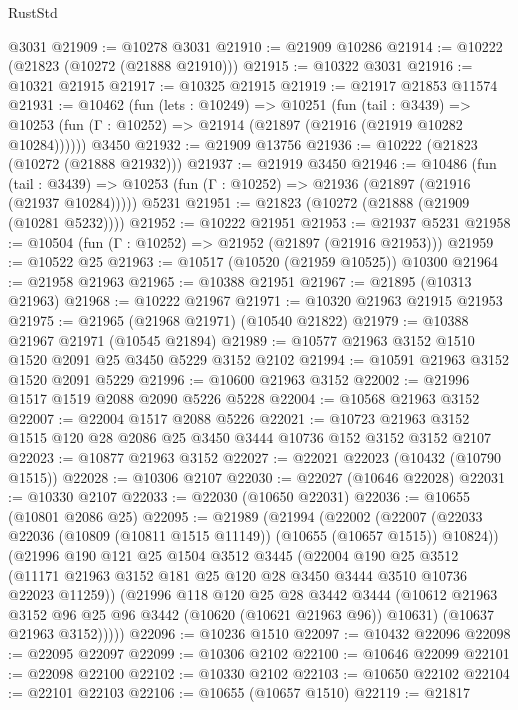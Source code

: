 \begin{lexlean}{RustStd}
\begin{coremodule}
    @3031
@21909 := @10278 @3031
@21910 := @21909 @10286
@21914 := @10222 (@21823 (@10272 (@21888 @21910)))
@21915 := @10322 @3031
@21916 := @10321 @21915
@21917 := @10325 @21915
@21919 := @21917 @21853 @11574
@21931 := @10462
    (fun (lets : @10249) =>
    @10251
      (fun (tail : @3439) =>
      @10253 (fun (Γ : @10252) => @21914 (@21897 (@21916 (@21919 @10282 @10284))))))
    @3450
@21932 := @21909 @13756
@21936 := @10222 (@21823 (@10272 (@21888 @21932)))
@21937 := @21919 @3450
@21946 := @10486
    (fun (tail : @3439) => @10253 (fun (Γ : @10252) => @21936 (@21897 (@21916 (@21937 @10284)))))
    @5231
@21951 := @21823 (@10272 (@21888 (@21909 (@10281 @5232))))
@21952 := @10222 @21951
@21953 := @21937 @5231
@21958 := @10504 (fun (Γ : @10252) => @21952 (@21897 (@21916 @21953)))
@21959 := @10522 @25
@21963 := @10517 (@10520 (@21959 @10525)) @10300
@21964 := @21958 @21963
@21965 := @10388 @21951
@21967 := @21895 (@10313 @21963)
@21968 := @10222 @21967
@21971 := @10320 @21963 @21915 @21953
@21975 := @21965 (@21968 @21971) (@10540 @21822)
@21979 := @10388 @21967 @21971 (@10545 @21894)
@21989 := @10577 @21963 @3152 @1510 @1520 @2091 @25 @3450 @5229 @3152 @2102
@21994 := @10591 @21963 @3152 @1520 @2091 @5229
@21996 := @10600 @21963 @3152
@22002 := @21996 @1517 @1519 @2088 @2090 @5226 @5228
@22004 := @10568 @21963 @3152
@22007 := @22004 @1517 @2088 @5226
@22021 := @10723 @21963 @3152 @1515 @120 @28 @2086 @25 @3450 @3444 @10736 @152 @3152 @3152 @2107
@22023 := @10877 @21963 @3152
@22027 := @22021 @22023 (@10432 (@10790 @1515))
@22028 := @10306 @2107
@22030 := @22027 (@10646 @22028)
@22031 := @10330 @2107
@22033 := @22030 (@10650 @22031)
@22036 := @10655 (@10801 @2086 @25)
@22095 := @21989
    (@21994
      (@22002
        (@22007 (@22033 @22036 (@10809 (@10811 @1515 @11149)) (@10655 (@10657 @1515)) @10824))
        (@21996
          @190
          @121
          @25
          @1504
          @3512
          @3445
          (@22004
            @190
            @25
            @3512
            (@11171 @21963 @3152 @181 @25 @120 @28 @3450 @3444 @3510 @10736 @22023 @11259))
          (@21996
            @118
            @120
            @25
            @28
            @3442
            @3444
            (@10612 @21963 @3152 @96 @25 @96 @3442 (@10620 (@10621 @21963 @96)) @10631)
            (@10637 @21963 @3152)))))
@22096 := @10236 @1510
@22097 := @10432 @22096
@22098 := @22095 @22097
@22099 := @10306 @2102
@22100 := @10646 @22099
@22101 := @22098 @22100
@22102 := @10330 @2102
@22103 := @10650 @22102
@22104 := @22101 @22103
@22106 := @10655 (@10657 @1510)
@22119 := @21817

\end{coremodule}
\end{lexlean}
